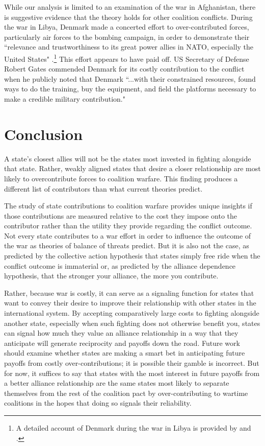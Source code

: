 \documentclass[12pt,letterpaper]{article}
\begin{document}
	While our analysis is limited to an examination of the war in Afghanistan, there is suggestive evidence that the theory holds for other coalition conflicts. During the war in Libya, Denmark made a concerted effort to over-contributed forces, particularly air forces to the bombing campaign, in order to demonstrate their ``relevance and trustworthiness to its great power allies in NATO, especially the United States" \citep[109]{jakobsen_goodnewslibya_2012}.\footnote{A detailed account of Denmark during the war in Libya is provided by \citet{dicke_natoburdensharinglibya_2013} and \citet{jakobsen_prestigeseekingsmallstates_2018}.} This effort appears to have paid off. US Secretary of Defense Robert Gates \citet{gates_securitydefenseagenda_2011} commended Denmark for its costly contribution to the conflict when he publicly noted that Denmark ``...with their constrained resources, found ways to do the training, buy the equipment, and field the platforms necessary to make a credible military contribution."

\section{Conclusion}
	A state's closest allies will not be the states most invested in fighting alongside that state. Rather, weakly aligned states that desire a closer relationship are most likely to overcontribute forces to coalition warfare. This finding produces a different list of contributors than what current theories predict.
	
	The study of state contributions to coalition warfare provides unique insights if those contributions are measured relative to the cost they impose onto the contributor rather than the utility they provide regarding the conflict outcome. Not every state contributes to a war effort in order to influence the outcome of the war as theories of balance of threats predict. But it is also not the case, as predicted by the collective action hypothesis that states simply free ride when the conflict outcome is immaterial or, as predicted by the alliance dependence hypothesis, that the stronger your alliance, the more you contribute.

	Rather, because war is costly, it can serve as a signaling function for states that want to convey their desire to improve their relationship with other states in the international system. By accepting comparatively large costs to fighting alongside another state, especially when such fighting does not otherwise benefit you, states can signal how much they value an alliance relationship in a way that they anticipate will generate reciprocity and payoffs down the road. Future work should examine whether states are making a smart bet in anticipating future payoffs from costly over-contributions; it is possible their gamble is incorrect. But for now, it suffices to say that states with the most interest in future payoffs from a better alliance relationship are the same states most likely to separate themselves from the rest of the coalition pact by over-contributing to wartime coalitions in the hopes that doing so signals their reliability.



\end{document}
